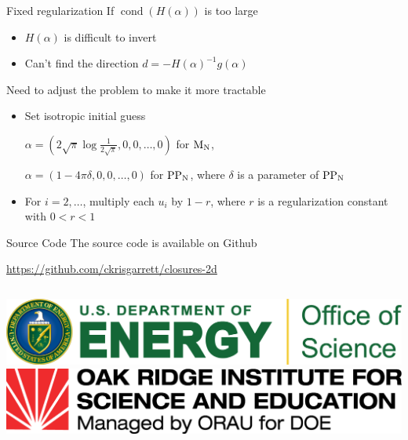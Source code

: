 \documentclass{beamer}
\DeclareMathOperator{\cond}{cond}
\renewcommand{\vec}[1]{\ensuremath{#1}}
\newcommand{\MN}{\ensuremath{\textnormal{M}_\textnormal{N}}\xspace}
\newcommand{\PPN}{\ensuremath{\textnormal{PP}_\textnormal{N}}\xspace}
\begin{document}
    \begin{frame}{Fixed regularization}
        If $\cond(H(\vec{\alpha}))$ is too large
        \begin{itemize}
            \item $H(\vec{\alpha})$ is difficult to invert
            \item Can't find the direction $\vec{d} = -H(\vec{\alpha})^{-1}g(\vec{\alpha})$
        \end{itemize}

        \vfill

        Need to adjust the problem to make it more tractable
        \begin{itemize}
            \item Set isotropic initial guess

                $\vec{\alpha} = (2\sqrt{\pi} \log \frac{1}{2\sqrt{\pi}}, 0, 0, \dots, 0)$ for \MN,

                $\vec{\alpha} = (1 - 4\pi\delta, 0, 0, \dots, 0)$ for \PPN, where $\delta$ is a parameter of \PPN
            \item For $i = 2,\dots$, multiply each $u_i$ by $1 - r$, where $r$ is a regularization constant with $0 < r < 1$
        \end{itemize}
    \end{frame}

    \begin{frame}{Source Code}
        The source code is available on Github

        \url{https://github.com/ckrisgarrett/closures-2d}

        \vfill

        \begin{columns}
            \includegraphics[width=\textwidth]{DOESClogo.png}
            \includegraphics[width=\textwidth]{ORISElogo.png}
        \end{columns}
    \end{frame}
\end{document}
